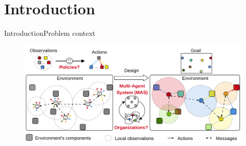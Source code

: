 

\addtocounter{framenumber}{-1}

\section{Introduction}
\begin{frame}{Introduction}{Problem context}

    \begin{figure}
        \includegraphics[width=0.9\linewidth]{figures/problem_illustration.png}
    \end{figure}

\end{frame}

